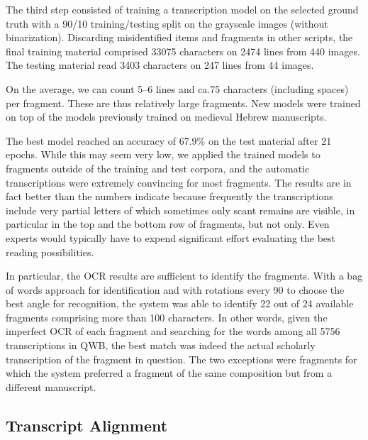 The third step consisted of training a transcription model on the selected
ground truth with a 90/10 training/testing split on the grayscale images
(without binarization).  Discarding misidentified items and fragments in other
scripts, the final training material comprised 33075 characters on 2474 lines
from 440 images.  The testing material read 3403 characters on 247 lines from
44 images.

On the average, we can count 5--6 lines and ca.\@ 75 characters (including
spaces) per fragment.  These are thus relatively large fragments.
New models were trained on top of the models previously trained on medieval
Hebrew manuscripts.

The best model reached an accuracy of 67.9\%  on the test material after 21
epochs. 
While this may seem very low, we applied the trained models to fragments
outside of the training and test corpora, and the automatic transcriptions were
extremely convincing for most fragments.  The results are in fact better than
the numbers indicate because frequently the transcriptions include very partial
letters of which sometimes only scant remains are visible, in particular in the
top and the bottom row of fragments, but not only.  Even experts would
typically have to expend significant effort evaluating the best reading
possibilities.

In particular, the OCR results are sufficient to identify the fragments.  With
a bag of words approach for identification and with rotations every 90{\degree}
to choose the best angle for recognition, the system was able to identify 22
out of 24 available fragments comprising more than 100 characters. 
In other words, given the imperfect OCR of each fragment and searching for the
words among all 5756 transcriptions in QWB, the best match was indeed the
actual scholarly transcription of the fragment in question.  The two exceptions
were fragments for which the system preferred a fragment of the same
composition but from a different manuscript.

\subsection{Transcript Alignment}\label{sec:al}

